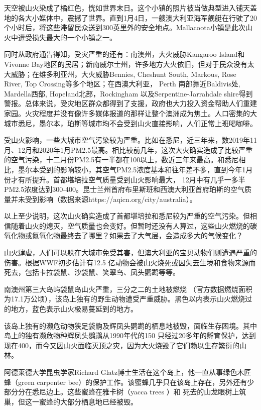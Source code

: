 \documentclass[
]{book}
\begin{document}
天空被山火染成了橘红色，恍如世界末日。这个小镇的照片被当做典型进入铺天盖地的各大小媒体中，震撼了世界。直到1月4日，一艘澳大利亚海军舰艇在行驶了20个小时后，将这些滞留民众送到300英里外的安全地点。Mallacoota小镇是此次山火中遭受损失最大的一个小镇之一。

同时从政府通告得知，受灾严重的还有：南澳州，大火威胁Kangaroo Island和Vivonne Bay地区的民居；新南威尔士州，许多地方大火依旧，但对于民众没有太大威胁；在维多利亚州，大火威胁Bennies, Cheshunt South, Markous, Rose River, Top Crossing等多个地区；在西澳大利亚， Perth 南部靠近Baldivis处, Mardella西部, Hopeland北部，Rockingham 以及Serpentine-Jarrahdale shire得到警报。总体来说，受灾地区群众都得到了支援，政府也大力投入资金帮助人们重建家园。火灾程度并没有像许多媒体报道的那样让整个澳洲成为焦土。人口密集的大城市悉尼，墨尔本，珀斯等城市均不会受到山火直接影响，人们正常上班喝咖啡。

受山火影响，一些大城市空气污染较为严重。比如在悉尼，近三年来，数2019年11月、12月和2020年1月PM2.5最高。相比较前几年，这次大火确实造成了比较严重的空气污染，十二月份PM2.5有一半都在100以上，数近三年来最高。和悉尼相比，墨尔本受到的影响较小，其空气PM2.5浓度基本和往年差不多，直到今年1月份才有所提升。首都堪培拉空气质量受到山火影响最大， 12月中有几乎一多半PM2.5浓度达到300-400。昆士兰州首府布里斯班和西澳大利亚首府珀斯的空气质量并未受到影响（数据来源https://aqicn.org/city/australia）。

以上至少说明，这次山火确实造成了首都堪培拉和悉尼较为严重的空气污染。但相信随着山火的熄灭，空气质量也会变好。但暂时还没有人算过，这些山火燃烧的碳氧化物或氮氧化物最终去了哪里？如果去了大气层，会造成多大的气候变化？

山火肆虐，人们可以躲在大城市免受其害，但澳大利亚的宝贝动物们则遭遇严重的伤害。根据WWF初步估计有12.5 亿动物会被山火烧死或因失去生境和食物来源而死去，包括卡拉袋鼠、沙袋鼠、笑翠鸟、凤头鹦鹉等等。

南澳州第三大岛屿袋鼠岛山火严重，三分之二的土地被燃烧 （官方数据燃烧面积为17.1万公顷），该岛上独有的野生动物遭受严重威胁。黑色以内表示山火燃烧过的地方，蓝色表示山火极易蔓延到的地方。

该岛上独有的濒危动物狭足袋鼩及辉凤头鹦鹉的栖息地被毁，面临生存困境。其中岛上的独有濒危物种辉凤头鹦鹉从1990年代的150 只经过20多年的孵育保护，达到现在400，而今又因山火面临灭顶之灾，因为大火烧毁了它们赖以生存繁衍的山林。

阿德莱德大学昆虫学家Richard Glatz博士生活在这个岛上，他一直从事绿色木匠蜂（green carpenter bee）的保护工作。该蜜蜂几乎只在该岛上存在，另外还有少部分分在悉尼边上。这些蜜蜂在雅卡树（yacca trees ）和 死去的山龙眼树上筑巢，但这一蜜蜂的大部分栖息地已经被毁。
\end{document}
